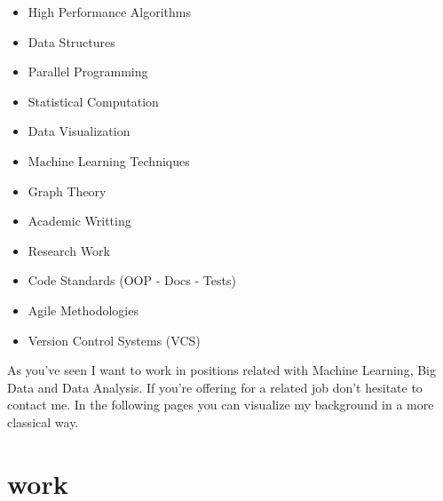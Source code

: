 \documentclass{friggeri-cv}
\newcommand{\myhref}[2]{\href[pdfnewwindow=true]{#1}{#2}}
\newcommand{\Unlimiteck}{\myhref{https://unlimiteck.com/}{Unlimiteck Company Builder}}
\newcommand{\UVa}{\myhref{http://www.uva.es}{University of Valladolid}}
\newcommand{\Brooktec}{\myhref{https://brooktec.com/}{Brooktec}}
\begin{document}
    \noindent
    \begin{minipage}[t]{0.5\linewidth}
      \begin{itemize}
      	\item{High Performance Algorithms}
  	    \item{Data Structures}
        \item{Parallel Programming}
        \item{Statistical Computation}
        \item{Data Visualization}
        \item{Machine Learning Techniques}
      \end{itemize}
    \end{minipage}%
    \begin{minipage}[t]{0.5\linewidth}
      \begin{itemize}
        \item{Graph Theory}
      	\item{Academic Writting}
        \item{Research Work}
        \item{Code Standards (OOP - Docs - Tests)}
        \item{Agile Methodologies}
        \item{Version Control Systems (VCS)}
      \end{itemize}
    \end{minipage}
    \par\bigskip

    As you've seen I want to work in positions related with Machine Learning, Big Data and Data Analysis. If you're offering for a related job don't hesitate to contact me. In the following pages you can visualize my background in a more classical way.


  \pagebreak


  \section{work}

\end{document}
